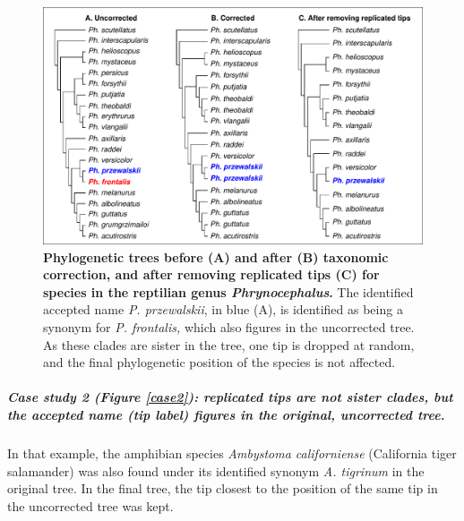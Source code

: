 \documentclass[11pt]{article}
\begin{document}
\begin{figure}[h!]
\centering
\includegraphics[scale=0.7]{figures/Case_studies/Case1}
\caption[Phylogenetic trees before (A) and after (B) taxonomic correction, and after removing replicated tips (C) for species in the reptilian genus \textit{Phrynocephalus}]{\textbf{Phylogenetic trees before (A) and after (B) taxonomic correction, and after removing replicated tips (C) for species in the reptilian genus \textit{Phrynocephalus}.} The identified accepted name \textit{P. przewalskii}, in blue (A), is identified as being a synonym for \textit{P. frontalis,} which also figures in the uncorrected tree. As these clades are sister in the tree, one tip is dropped at random, and the final phylogenetic position of the species is not affected.}
\label{case1}
\end{figure}


\subparagraph{Case study 2 (Figure \ref{case2}): replicated tips are not sister clades, but the accepted name (tip label) figures in the original, uncorrected tree.} In that example, the amphibian species \textit{Ambystoma californiense} (California tiger salamander) was also found under its identified synonym \textit{A. tigrinum} in the original tree. In the final tree, the tip closest to the position of the same tip in the uncorrected tree was kept.
\end{document}
